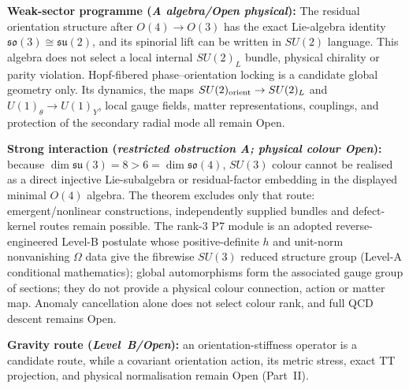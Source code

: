 \documentclass[11pt,a4paper]{article}
\begin{document}
\textbf{Weak-sector programme (\emph{A algebra/Open physical}):} The residual orientation structure after $O(4)\to O(3)$ has the exact Lie-algebra identity $\mathfrak{so}(3)\cong\mathfrak{su}(2)$, and its spinorial lift can be written in $SU(2)$ language.  This algebra does not select a local internal $SU(2)_L$ bundle, physical chirality or parity violation.  Hopf-fibered phase--orientation locking is a candidate global geometry only.  Its dynamics, the maps $SU(2)_{\rm orient}\to SU(2)_L$ and $U(1)_\theta\to U(1)_Y$, local gauge fields, matter representations, couplings, and protection of the secondary radial mode all remain Open.

\textbf{Strong interaction (\emph{restricted obstruction A; physical colour Open}):} because $\dim\mathfrak{su}(3)=8>6=\dim\mathfrak{so}(4)$, $SU(3)$ colour cannot be realised as a direct injective Lie-subalgebra or residual-factor embedding in the displayed minimal $O(4)$ algebra.  The theorem excludes only that route: emergent/nonlinear constructions, independently supplied bundles and defect-kernel routes remain possible.  The rank-3 P7 module is an adopted reverse-engineered Level-B postulate whose positive-definite $h$ and unit-norm nonvanishing $\Omega$ data give the fibrewise $SU(3)$ reduced structure group (Level-A conditional mathematics); global automorphisms form the associated gauge group of sections; they do not provide a physical colour connection, action or matter map.  Anomaly cancellation alone does not select colour rank, and full QCD descent remains Open.

\textbf{Gravity route (\emph{Level~B/Open}):} an orientation-stiffness operator is a candidate route, while a covariant orientation action, its metric stress, exact TT projection, and physical normalisation remain Open (Part~II).
\end{document}

